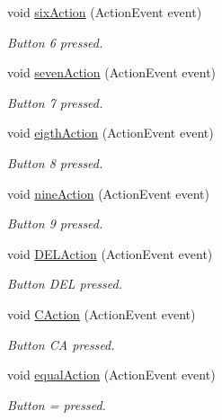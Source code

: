 \begin{DoxyCompactItemize}
void \hyperlink{classGUI__Controller_a7d45a1041c32ff8ca5e721c56651fe49}{six\+Action} (Action\+Event event)
\begin{DoxyCompactList}\small\item\em Button \textquotesingle{}6\textquotesingle{} pressed. \end{DoxyCompactList}\item 
void \hyperlink{classGUI__Controller_a4eece09e941a48b35c7c4e067ee02317}{seven\+Action} (Action\+Event event)
\begin{DoxyCompactList}\small\item\em Button \textquotesingle{}7\textquotesingle{} pressed. \end{DoxyCompactList}\item 
void \hyperlink{classGUI__Controller_a8688f22bd92312d2e1b9c1d74df7e7fc}{eigth\+Action} (Action\+Event event)
\begin{DoxyCompactList}\small\item\em Button \textquotesingle{}8\textquotesingle{} pressed. \end{DoxyCompactList}\item 
void \hyperlink{classGUI__Controller_aa5e4b5629d363e264f832c0d17b04d4b}{nine\+Action} (Action\+Event event)
\begin{DoxyCompactList}\small\item\em Button \textquotesingle{}9\textquotesingle{} pressed. \end{DoxyCompactList}\item 
void \hyperlink{classGUI__Controller_a491246305bbe61ee5267a9b3a06fb3cb}{D\+E\+L\+Action} (Action\+Event event)
\begin{DoxyCompactList}\small\item\em Button \textquotesingle{}D\+EL\textquotesingle{} pressed. \end{DoxyCompactList}\item 
void \hyperlink{classGUI__Controller_a33eaf846c2f54a13fcdf8a4e0dfb98d0}{C\+Action} (Action\+Event event)
\begin{DoxyCompactList}\small\item\em Button \textquotesingle{}CA\textquotesingle{} pressed. \end{DoxyCompactList}\item 
void \hyperlink{classGUI__Controller_a5ab4d097a40e0ea15392c65757a052aa}{equal\+Action} (Action\+Event event)
\begin{DoxyCompactList}\small\item\em Button \textquotesingle{}=\textquotesingle{} pressed. \end{DoxyCompactList}\item 

\end{DoxyCompactItemize}
